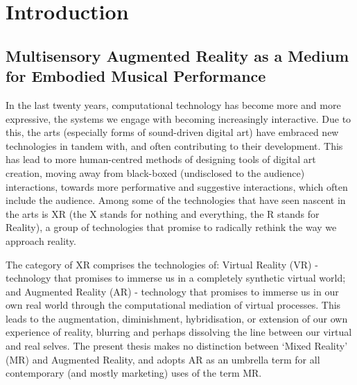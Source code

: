 \chapter{Introduction}

\section{Multisensory Augmented Reality as a Medium for Embodied Musical Performance}
In the last twenty years, computational technology has become more and more expressive, the systems we engage with becoming increasingly interactive. Due to this, the arts (especially forms of sound-driven digital art) have embraced new technologies in tandem with, and often contributing to their development. This has lead to more human-centred methods of designing tools of digital art creation, moving away from black-boxed (undisclosed to the audience) interactions, towards more performative and suggestive interactions, which often include the audience. Among some of the technologies that have seen nascent in the arts is XR (the X stands for nothing and everything, the R stands for Reality), a group of technologies that promise to radically rethink the way we approach reality. 

The category of XR comprises the technologies of: Virtual Reality (VR) - technology that promises to immerse us in a completely synthetic virtual world; and Augmented Reality (AR) -  technology that promises to immerse us in our own real world through the computational mediation of virtual processes. This leads to the augmentation, diminishment, hybridisation, or extension of our own experience of reality, blurring and perhaps dissolving the line between our virtual and real selves. The present thesis makes no distinction between `Mixed Reality' (MR) and Augmented Reality, and adopts AR as an umbrella term for all contemporary (and mostly marketing) uses of the term MR.

